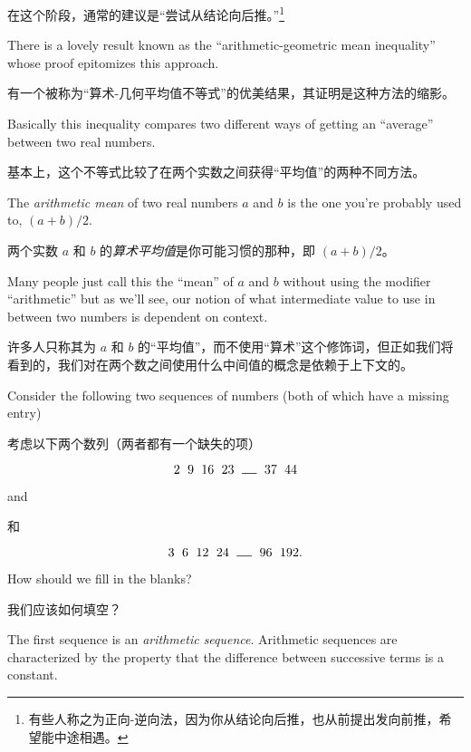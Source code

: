 在这个阶段，通常的建议是“尝试从结论向后推。”\footnote{有些人称之为正向-逆向法，因为你从结论向后推，也从前提出发向前推，希望能中途相遇。}

There is a lovely result known as the
``arithmetic-geometric mean inequality''
whose proof epitomizes this approach.

有一个被称为“算术-几何平均值不等式”的优美结果，其证明是这种方法的缩影。

Basically this inequality compares two
different ways of getting an ``average'' between two real numbers.

基本上，这个不等式比较了在两个实数之间获得“平均值”的两种不同方法。

The
\emph{arithmetic mean} of two real numbers $a$ and $b$ is the one you're
probably used to, $(a+b)/2$.

两个实数 $a$ 和 $b$ 的\emph{算术平均值}是你可能习惯的那种，即 $(a+b)/2$。

Many people just call this the ``mean''
of $a$ and $b$ without using the modifier ``arithmetic'' but as we'll
see, our notion of what intermediate value to use in between two numbers
is dependent on context.

许多人只称其为 $a$ 和 $b$ 的“平均值”，而不使用“算术”这个修饰词，但正如我们将看到的，我们对在两个数之间使用什么中间值的概念是依赖于上下文的。

Consider the following two sequences of numbers
(both of which have a missing entry)

考虑以下两个数列（两者都有一个缺失的项）

\[ 2 \rule{6pt}{0pt} 9  \rule{6pt}{0pt} 16  \rule{6pt}{0pt} 23  \rule{6pt}{0pt} \rule{12pt}{.5pt}  \rule{6pt}{0pt} 37  \rule{6pt}{0pt} 44 \]

\noindent and

\noindent 和

\[ 3 \rule{6pt}{0pt} 6  \rule{6pt}{0pt} 12  \rule{6pt}{0pt} 24  \rule{6pt}{0pt} \rule{12pt}{.5pt}  \rule{6pt}{0pt} 96  \rule{6pt}{0pt} 192. \]

\noindent How should we fill in the blanks?

\noindent 我们应该如何填空？

The first sequence is an
\emph{arithmetic sequence}.
Arithmetic sequences
are characterized by the property that the difference between successive
terms is a constant.


